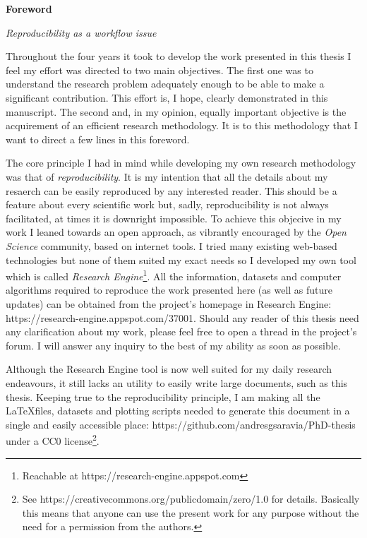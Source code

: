 
\cleardoublepage
{}
{}
\begin{center}
\textbf{\large Foreword}

\textit{Reproducibility as a workflow issue}
\end{center}

Throughout the four years it took to develop the work presented in this thesis I feel my effort was directed to two main objectives.
The first one was to understand the research problem adequately enough to be able to make a significant contribution. 
This effort is, I hope, clearly demonstrated in this manuscript.
The second and, in my opinion, equally important objective is the acquirement of an efficient research methodology.
It is to this methodology that I want to direct a few lines in this foreword.

The core principle I had in mind while developing my own research methodology was that of \textit{reproducibility}.
It is my intention that all the details about my resaerch can be easily reproduced by any interested reader.
This should be a feature about every scientific work but, sadly, reproducibility is not always facilitated, at times it is downright impossible.
To achieve this objecive in my work I leaned towards an open approach, as vibrantly encouraged by the \textit{Open Science} community, based on internet tools.
I tried many existing web-based technologies but none of them suited my exact needs so I developed my own tool which is called \textit{Research Engine}\footnote{Reachable at https://research-engine.appspot.com}.
All the information, datasets and computer algorithms required to reproduce the work presented here (as well as future updates) can be obtained from the project's homepage in Research Engine: https://research-engine.appspot.com/37001. 
Should any reader of this thesis need any clarification about my work, please feel free to open a thread in the project's forum.
I will answer any inquiry to the best of my ability as soon as possible.

Although the Research Engine tool is now well suited for my daily research endeavours, it still lacks an utility to easily write large documents, such as this thesis.
Keeping true to the reproducibility principle, I am making all the \LaTeX files, datasets and plotting scripts needed to generate this document in a single and easily accessible place: https://github.com/andresgsaravia/PhD-thesis under a CC0 license\footnote{See https://creativecommons.org/publicdomain/zero/1.0 for details. Basically this means that anyone can use the present work for any purpose without the need for a permission from the authors.}.